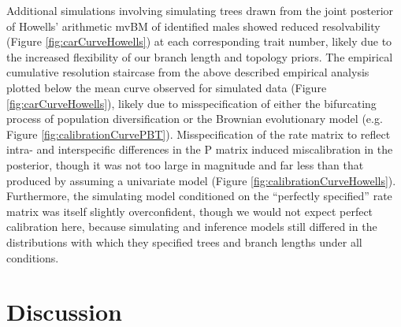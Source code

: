 \documentclass[10pt, twocolumn, twoside]{article}
\begin{document}

Additional simulations involving simulating trees drawn from the joint posterior of Howells’ arithmetic mvBM of identified males showed reduced resolvability (Figure \ref{fig:carCurveHowells}) at each corresponding trait number, likely due to the increased flexibility of our branch length and topology priors. The empirical cumulative resolution staircase from the above described empirical analysis plotted below the mean curve observed for simulated data (Figure \ref{fig:carCurveHowells}), likely due to misspecification of either the bifurcating process of population diversification or the Brownian evolutionary model (e.g. Figure \ref{fig:calibrationCurvePBT}). Misspecification of the rate matrix to reflect intra- and interspecific differences in the P matrix induced miscalibration in the posterior, though it was not too large in magnitude and far less than that produced by assuming a univariate model (Figure \ref{fig:calibrationCurveHowells}). Furthermore, the simulating model conditioned on the “perfectly specified” rate matrix was itself slightly overconfident, though we would not expect perfect calibration here, because simulating and inference models still differed in the distributions with which they specified trees and branch lengths under all conditions.

\clearpage

\section{Discussion}
\end{document}
